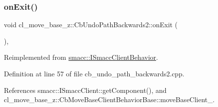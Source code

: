 \mbox{\label{classcl__move__base__z_1_1CbUndoPathBackwards2_ae493fcd813176d8473ff08680beb7afe}} 
\subsubsection{\texorpdfstring{on\+Exit()}{onExit()}}
{\footnotesize\ttfamily void cl\+\_\+move\+\_\+base\+\_\+z\+::\+Cb\+Undo\+Path\+Backwards2\+::on\+Exit (\begin{DoxyParamCaption}{ }\end{DoxyParamCaption})\hspace{0.3cm}{\ttfamily [override]}, {\ttfamily [virtual]}}



Reimplemented from \hyperlink{classsmacc_1_1ISmaccClientBehavior_ad1198fdb2cbdf11f3276d3e23d4c0a50}{smacc\+::\+I\+Smacc\+Client\+Behavior}.



Definition at line 57 of file cb\+\_\+undo\+\_\+path\+\_\+backwards2.\+cpp.



References smacc\+::\+I\+Smacc\+Client\+::get\+Component(), and cl\+\_\+move\+\_\+base\+\_\+z\+::\+Cb\+Move\+Base\+Client\+Behavior\+Base\+::move\+Base\+Client\+\_\+.


